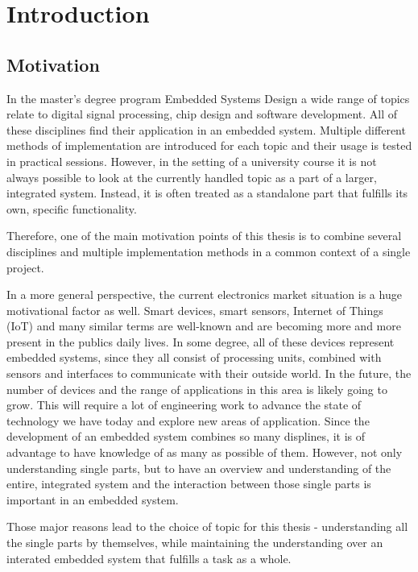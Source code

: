 \chapter{Introduction}
\label{cha:Introduction}

\section{Motivation}

In the master's degree program Embedded Systems Design a wide range of topics relate to digital signal processing, chip design and software development.
All of these disciplines find their application in an embedded system.
Multiple different methods of implementation are introduced for each topic and their usage is tested in practical sessions.
However, in the setting of a university course it is not always possible to look at the currently handled topic as a part of a larger, integrated system.
Instead, it is often treated as a standalone part that fulfills its own, specific functionality.

Therefore, one of the main motivation points of this thesis is to combine several disciplines and multiple implementation methods in a common context of a single project.

In a more general perspective, the current electronics market situation is a huge motivational factor as well.
Smart devices, smart sensors, Internet of Things (IoT) and many similar terms are well-known and are becoming more and more present in the publics daily lives.
In some degree, all of these devices represent embedded systems, since they all consist of processing units, combined with sensors and interfaces to communicate with their outside world.
In the future, the number of devices and the range of applications in this area is likely going to grow.
This will require a lot of engineering work to advance the state of technology we have today and explore new areas of application.
Since the development of an embedded system combines so many displines, it is of advantage to have knowledge of as many as possible of them.
However, not only understanding single parts, but to have an overview and understanding of the entire, integrated system and the interaction between those single parts is important in an embedded system.

Those major reasons lead to the choice of topic for this thesis - understanding all the single parts by themselves, while maintaining the understanding over an interated embedded system that fulfills a task as a whole.

